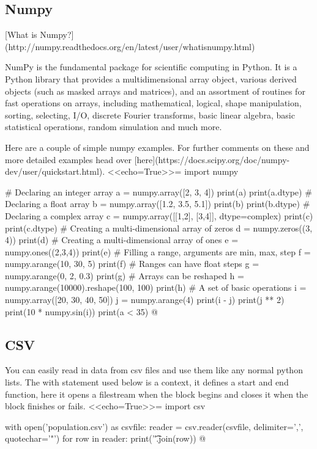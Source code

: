 \documentclass[12pt]{exam}
\begin{document}
\subsection{Numpy}
[What is Numpy?](http://numpy.readthedocs.org/en/latest/user/whatisnumpy.html)

NumPy is the fundamental package for scientific computing in Python. It is a Python library that provides a
multidimensional array object, various derived objects (such as masked arrays and matrices), and an assortment of
routines for fast operations on arrays, including mathematical, logical, shape manipulation, sorting, selecting, I/O,
discrete Fourier transforms, basic linear algebra, basic statistical operations, random simulation and much more.

Here are a couple of simple numpy examples. For further comments on these and more detailed examples head over
[here](https://docs.scipy.org/doc/numpy-dev/user/quickstart.html).
<<echo=True>>=
import numpy

# Declaring an integer array
a = numpy.array([2, 3, 4])
print(a)
print(a.dtype)
# Declaring a float array
b = numpy.array([1.2, 3.5, 5.1])
print(b)
print(b.dtype)
# Declaring a complex array
c = numpy.array([[1,2], [3,4]], dtype=complex)
print(c)
print(c.dtype)
# Creating a multi-dimensional array of zeros
d = numpy.zeros((3, 4))
print(d)
# Creating a multi-dimensional array of ones
e = numpy.ones((2,3,4))
print(e)
# Filling a range, arguments are min, max, step
f = numpy.arange(10, 30, 5)
print(f)
# Ranges can have float steps
g = numpy.arange(0, 2, 0.3)
print(g)
# Arrays can be reshaped
h = numpy.arange(10000).reshape(100, 100)
print(h)
# A set of basic operations
i = numpy.array([20, 30, 40, 50])
j = numpy.arange(4)
print(i - j)
print(j ** 2)
print(10 * numpy.sin(i))
print(a < 35)
@


\subsection{CSV}
You can easily read in data from csv files and use them like any normal python lists. The with statement used below is a
context, it defines a start and end function, here it opens a filestream when the block begins and closes it when the
block finishes or fails.
<<echo=True>>=
import csv

with open('population.csv') as csvfile:
    reader = csv.reader(csvfile, delimiter=',', quotechar='"')
    for row in reader:
        print('\t'.join(row))
@
\end{document}
